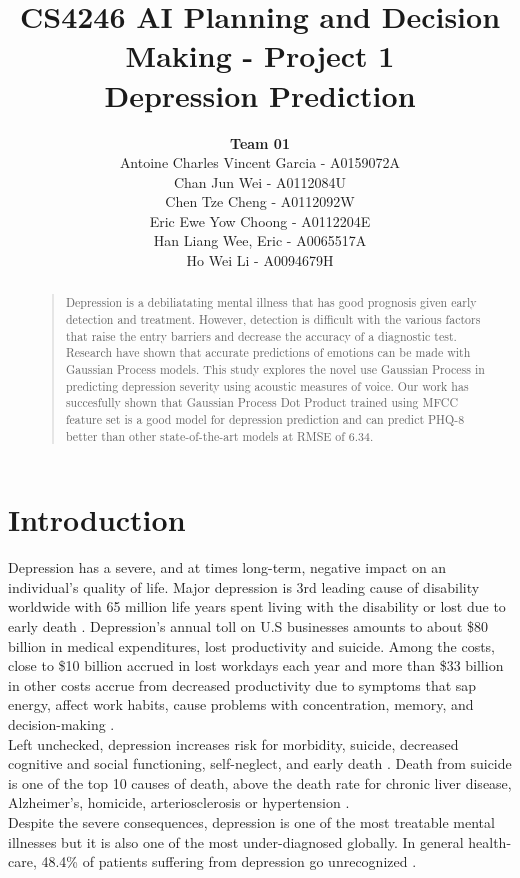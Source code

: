 \documentclass{article}
\title{
	CS4246 AI Planning and Decision Making - Project 1 \\
	Depression Prediction
}
\author{
	{\bf Team 01} \\
	Antoine Charles Vincent Garcia - A0159072A\\
	Chan Jun Wei - A0112084U\\
	Chen Tze Cheng - A0112092W\\
	Eric Ewe Yow Choong - A0112204E\\
	Han Liang Wee, Eric - A0065517A\\
	Ho Wei Li - A0094679H\\
}
\begin{document}
 	\maketitle

	\begin{abstract}
	\begin{quote}
	Depression is a debiliatating mental illness that has good prognosis given early detection and treatment. 
	However, detection is difficult with the various factors that raise the entry barriers and decrease the accuracy of a diagnostic test. Research have shown that accurate predictions of emotions can be made with Gaussian Process models. This study explores the novel use Gaussian Process in predicting depression severity using acoustic measures of voice.
	Our work has succesfully shown that Gaussian Process Dot Product trained using MFCC feature set is a good model for depression prediction and can predict PHQ-8 better than other state-of-the-art models at RMSE of 6.34.\\
	\end{quote}
	\end{abstract}
	
	\section{Introduction}
	Depression has a severe, and at times long-term, negative impact on an individual's quality of life. 
	Major depression is 3rd leading cause of disability worldwide with 65 million life years spent living with the disability or lost due to early death \cite{who2004}.
	Depression's annual toll on U.S businesses amounts to about \$80 billion in medical expenditures, lost productivity and suicide. 
	Among the costs, close to \$10 billion accrued in lost workdays each year and more than \$33 billion in other costs accrue from decreased productivity due to symptoms that sap energy, affect work habits, cause problems with concentration, memory, and decision-making \cite{tjcp2015}. \\

	Left unchecked, depression increases risk for morbidity, suicide, decreased cognitive and social functioning, self-neglect, and early death \cite{arcp2009}. 
	Death from suicide is one of the top 10 causes of death, above the death rate for chronic liver disease, Alzheimer's, homicide, arteriosclerosis or hypertension \cite{nvsr2016}. \\

	Despite the severe consequences, depression is one of the most treatable mental illnesses but it is also one of the most under-diagnosed globally. 
	In general health-care, 48.4\% of patients suffering from depression go unrecognized \cite{jama2003}.
\end{document}
